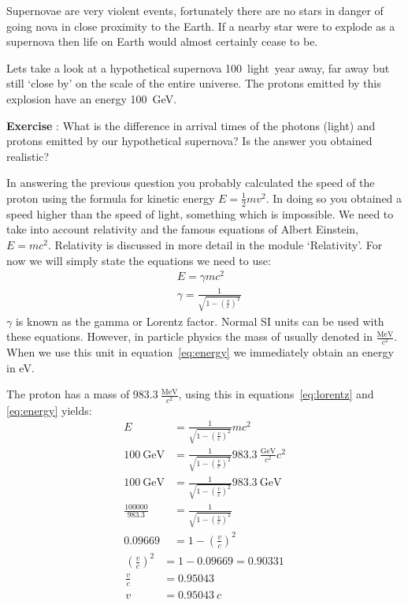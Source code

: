 \documentclass[12pt,a4paper]{article}
\numberwithin{equation}{section}
\numberwithin{figure}{section}
\newcounter{Exercise}
\numberwithin{table}{section}
\begin{document}
Supernovae are very violent events, fortunately there are no stars in danger of going nova in close proximity to the Earth. If a nearby star were to explode as a supernova then life on Earth would almost certainly cease to be.

Lets take a look at a hypothetical supernova 100~light~year away, far away but still `close by' on the scale of the entire universe. The protons emitted by this explosion have an energy 100~GeV.
\begin{shaded}
\textbf{Exercise \theExercise {}} : What is the difference in arrival times of the photons (light) and protons emitted by our hypothetical supernova? Is the answer you obtained realistic?\end{shaded}

In answering the previous question you probably calculated the speed of the proton using the formula for kinetic energy $E=\frac{1}{2}mv^2$. In doing so you obtained a speed higher than the speed of light, something which is impossible. We need to take into account relativity and the famous equations of Albert Einstein, $E=mc^2$. Relativity is discussed in more detail in the module `Relativity'. For now we will simply state the equations we need to use:
\begin{align}
& E=\gamma mc^2 \label{eq:energy}\\
& \gamma = \frac{1}{\sqrt{1-\left( \frac{v}{c} \right)^2 }} \label{eq:lorentz}
\end{align}
$\gamma$ is known as the gamma or Lorentz factor. Normal SI units can be used with these equations. However, in particle physics the mass of usually denoted in $\frac{\mbox{MeV}}{c^2}$. When we use this unit in equation~\ref{eq:energy} we immediately obtain an energy in eV.

The proton has a mass of $983.3~\frac{\mbox{MeV}}{c^2}$, using this in equations~\ref{eq:lorentz} and \ref{eq:energy} yields:
\begin{align}
E &= \frac{1}{\sqrt{1-\left( \frac{v}{c}\right)^2}} mc^2 \\
100~\mbox{GeV} &= \frac{1}{\sqrt{1-\left( \frac{v}{c}\right)^2}} 983.3~\frac{\mbox{GeV}}{c^2}c^2 \\
100~\mbox{GeV} &= \frac{1}{\sqrt{1-\left( \frac{v}{c}\right)^2}} 983.3~\mbox{GeV} \\
\frac{100000}{983.3} &= \frac{1}{\sqrt{1-\left( \frac{v}{c}\right)^2}} \\
0.09669 &= 1 - \left( \frac{v}{c} \right)^2 
\end{align}
\begin{align}
\left( \frac{v}{c} \right)^2 &= 1-0.09669=0.90331 \\
\frac{v}{c} &= 0.95043 \\
v &= 0.95043~c
\end{align}
\end{document}
